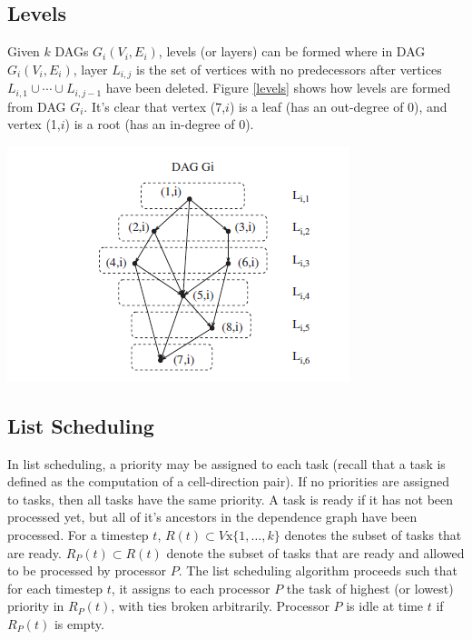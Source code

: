 \documentclass[11pt, letterpaper,titlepage,oneside]{article}
\begin{document}
\subsection*{Levels}

Given $k$ DAGs $G_i(V_i,E_i)$, levels (or layers) can be formed where in DAG $G_i(V_i,E_i)$, layer $L_{i,j}$ is the set of vertices with no predecessors after vertices $L_{i,1}\cup\cdots\cup L_{i,j-1}$ have been deleted. Figure \ref{levels} shows how levels are formed from DAG $G_{i}$. It's clear that vertex (7,$i$) is a leaf (has an out-degree of 0), and vertex (1,$i$) is a root (has an in-degree of 0).

\bigskip

\noindent\begin{minipage}{\textwidth}
\centering
\includegraphics[scale = 1]{Levels.png}
\label{levels}
\end{minipage}

\subsection*{List Scheduling}

In list scheduling, a priority may be assigned to each task (recall that a task is defined as the computation of a cell-direction pair). If no priorities are assigned to tasks, then all tasks have the same priority. A task is ready if it has not been processed yet, but all of it's ancestors in the dependence graph have been processed. For a timestep $t$, $R(t)\subset V\text{x}\{1,\ldots,k\}$ denotes the subset of tasks that are ready. $R_P(t)\subset R(t)$ denote the subset of tasks that are ready and allowed to be processed by processor $P$. The list scheduling algorithm proceeds such that for each timestep $t$, it assigns to each processor $P$ the task of highest (or lowest) priority in $R_P(t)$, with ties broken arbitrarily. Processor $P$ is idle at time $t$ if $R_P(t)$ is empty. 
\end{document}
